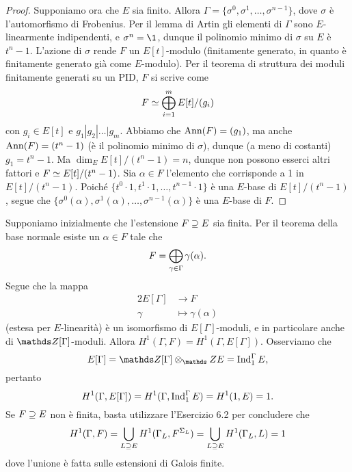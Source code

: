 \documentclass[a4paper]{article}
\begin{document}
\begin{proof}
Supponiamo ora che $E$ sia finito. Allora $\Gamma=\{\sigma^0,\sigma^1,\ldots,\sigma^{n-1}\}$, dove $\sigma$ è l'automorfismo di Frobenius. Per il lemma di Artin gli elementi di $\Gamma$ sono $E$-linearmente indipendenti, e $\sigma^n=\1$, dunque il polinomio minimo di $\sigma$ su $E$ è $t^n-1$. L'azione di $\sigma$ rende $F$ un $E[t]$-modulo (finitamente generato, in quanto è finitamente generato già come $E$-modulo). Per il teorema di struttura dei moduli finitamente generati su un PID, $F$ si scrive come
$$
F\simeq\bigoplus_{i=1}^m E[t]/(g_i)
$$
con $g_i\in E[t]$ e $g_1|g_2|\ldots|g_m$. Abbiamo che $\operatorname{Ann}(F)=(g_1)$, ma anche $\operatorname{Ann}(F)=(t^n-1)$ (è il polinomio minimo di $\sigma$), dunque (a meno di costanti) $g_1=t^n-1$. Ma $\dim_E E[t]/(t^n-1)=n$, dunque non possono esserci altri fattori e $F\simeq E[t]/(t^n-1)$. Sia $\alpha\in F$ l'elemento che corrisponde a 1 in $E[t]/(t^n-1)$. Poiché $\{t^0\cdot1,t^1\cdot1,\ldots,t^{n-1}\cdot1\}$ è una $E$-base di $E[t]/(t^n-1)$, segue che $\{\sigma^0(\alpha),\sigma^1(\alpha),\ldots,\sigma^{n-1}(\alpha)\}$ è una $E$-base di $F$.
\end{proof}
Supponiamo inizialmente che l'estensione $F\supseteq E$ sia finita. Per il teorema della base normale esiste un $\alpha\in F$ tale che
$$
F=\bigoplus_{\gamma\in\Gamma}\gamma(\alpha).
$$
Segue che la mappa
\begin{alignat*}{2}
E[\Gamma]&\longrightarrow F\\
\gamma&\longmapsto\gamma(\alpha)
\end{alignat*}
(estesa per $E$-linearità) è un isomorfismo di $E[\Gamma]$-moduli, e in particolare anche di $\ZZ[\Gamma]$-moduli. Allora $H^1(\Gamma,F)=H^1(\Gamma,E[\Gamma])$. Osserviamo che
$$
E[\Gamma]=\ZZ[\Gamma]\tensor_\ZZ E=\Ind_1^\Gamma E,
$$
pertanto
$$
H^1(\Gamma,E[\Gamma])=H^1(\Gamma,\operatorname{Ind}_1^\Gamma E)=H^1(1,E)=1.
$$
Se $F\supseteq E$ non è finita, basta utilizzare l'Esercizio 6.2 per concludere che
$$
H^1(\Gamma,F)=\bigcup_{L\supseteq E}H^1(\Gamma_L,F^{\Sigma_L})=\bigcup_{L\supseteq E}H^1(\Gamma_L,L)=1
$$
dove l'unione è fatta sulle estensioni di Galois finite.
\end{document}
